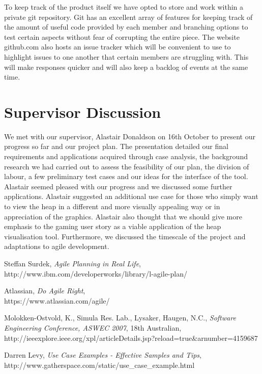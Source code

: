 \documentclass[10pt, a4paper]{article}
\begin{document}
To keep track of the product itself we have opted to store and work within a private git repository. Git has an excellent array of features for keeping track of the amount of useful code provided by each member and branching options to test certain aspects without fear of corrupting the entire piece. The website github.com also hosts an issue tracker which will be convenient to use to highlight issues to one another that certain members are struggling with. This will make responses quicker and will also keep a backlog of events at the same time.
 
\section{Supervisor Discussion}

We met with our supervisor, Alastair Donaldson on 16th October to present our progress so far and our project plan. The presentation detailed our final requirements and applications acquired through case analysis, the background research we had carried out to assess the feasibility of our plan, the division of labour, a few preliminary test cases and our ideas for the interface of the tool. Alastair seemed pleased with our progress and we discussed some further applications. Alastair suggested an additional use case for those who simply want to view the heap in a different and more visually appealing way or in appreciation of the graphics. Alastair also thought that we should give more emphasis to the gaming user story as a viable application of the heap visualisation tool. Furthermore, we discussed the timescale of the project and adaptations to agile development. 

\cite{ssagile,atlasagile}

\begin{thebibliography}{9}

  Steffan Surdek,
  \emph{Agile Planning in Real Life},
  \\http://www.ibm.com/developerworks/library/l-agile-plan/

  Atlassian,
  \emph{Do Agile Right},
  \\https://www.atlassian.com/agile/
  
  Molokken-Ostvold, K., Simula Res. Lab., Lysaker, Haugen, N.C.,
  \emph{Software Engineering Conference, ASWEC 2007},
  18th Australian,
  \\http://ieeexplore.ieee.org/xpl/articleDetails.jsp?reload=true{\&}arnumber=4159687
  
  Darren Levy,
  \emph{Use Case Examples - Effective Samples and Tips},
  \\http://www.gatherspace.com/static/use{\_}case{\_}example.html

\end{thebibliography}
\end{document}
